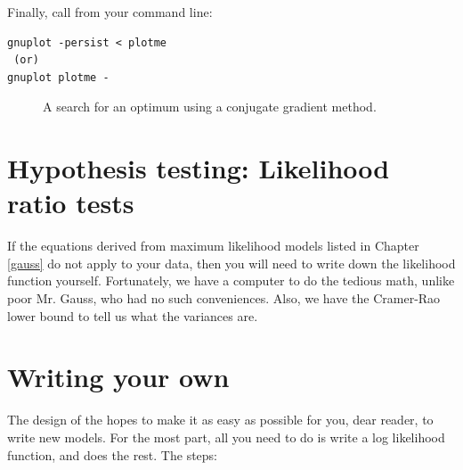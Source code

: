 Finally, call  from your command line:
\begin{lstlisting}
gnuplot -persist < plotme
 (or)
gnuplot plotme -
\end{lstlisting}

\begin{figure}
\caption{A search for an optimum using a conjugate gradient method.}
\end{figure}

\section{Hypothesis testing: Likelihood ratio tests} 
If the equations derived from maximum likelihood models listed in
Chapter \ref{gauss} do not apply to your data,
then you will need to write down the likelihood
function yourself.  Fortunately, we have a computer to do the tedious
math, unlike poor Mr. Gauss, who had no such conveniences.  Also, we
have the Cramer-Rao lower bound to tell us what the variances are.



\section{Writing your own}
The design of the  hopes to make it as easy as
possible for you, dear reader, to write new models. For the most
part, all you need to do is write a log likelihood function, and
 does the rest. The steps:


